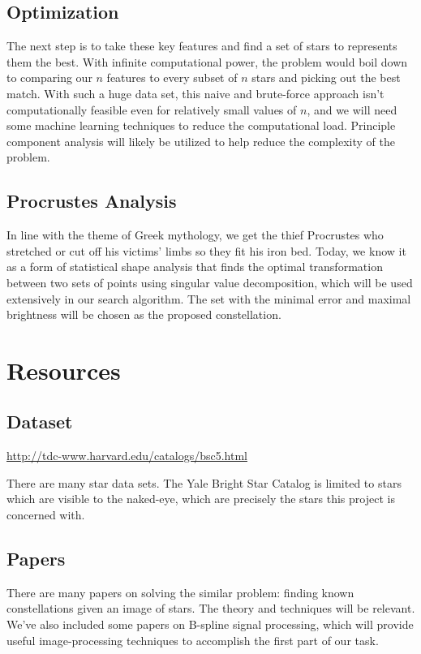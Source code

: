\documentclass{article}
\begin{document}
\subsection{Optimization}
The next step is to take these key features and find a set of stars to represents them the best. With infinite computational power, the problem would boil down to comparing our $n$ features to every subset of $n$ stars and picking out the best match. With such a huge data set, this naive and brute-force approach isn't computationally feasible even for relatively small values of $n$, and we will need some machine learning techniques to reduce the computational load. Principle component analysis will likely be utilized to help reduce the complexity of the problem.
\subsection{Procrustes Analysis}
In line with the theme of Greek mythology, we get the thief Procrustes who stretched or cut off his victims' limbs so they fit his iron bed. Today, we know it as a form of statistical shape analysis that finds the optimal transformation between two sets of points using singular value decomposition, which will be used extensively in our search algorithm.  The set with the minimal error and maximal brightness will be chosen as the proposed constellation.


\section{Resources}


\subsection{Dataset}
\url{http://tdc-www.harvard.edu/catalogs/bsc5.html}

There are many star data sets. The Yale Bright Star Catalog is limited to stars which are visible to the naked-eye, which are precisely the stars this project is concerned with.

\subsection{Papers}
There are many papers on solving the similar problem: finding known constellations given an image of stars. The theory and techniques will be relevant. We've also included some papers on B-spline signal processing, which will provide useful image-processing techniques to accomplish the first part of our task.
\end{document}
